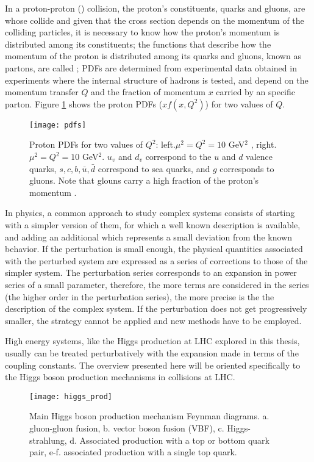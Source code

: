 In a proton-proton (\pp) collision, the proton's constituents, quarks and gluons, are whose collide and given that the \pp cross section depends on the momentum of the colliding particles, it is necessary to know how the proton's momentum is distributed among its constituents; the functions that describe how the momentum of the proton is distributed among its quarks and gluons, known as partons, are called ; PDFs are determined from experimental data obtained in experiments where the internal structure of hadrons is tested, and depend on the momentum transfer $Q$ and the fraction of momentum $x$ carried by an specific parton. Figure \ref{fig:pdfs} shows the proton PDFs ($xf(x,Q^2)$) for two values of $Q$.     

\begin{figure}[!h]
\centering
\texttt{[image: pdfs]}
\caption[Proton PDFs]{Proton PDFs for two values of $Q^2$: left.$\mu^2=Q^2=10$ GeV$^2$ , right. $\mu^2=Q^2=10$ GeV$^2$. $u_v$ and $d_v$ correspond to the $u$ and $d$ valence quarks, $s, c, b, \bar{u}, \bar{d}$ correspond to sea quarks, and $g$ corresponds to gluons. Note that glouns carry a high fraction of the proton's momentum \cite{pdg}.}
\label{fig:pdfs}
\end{figure}

In physics, a common approach to study complex systems consists of starting with a simpler version of them, for which a well known description is available, and adding an additional  which represents a small deviation from the known behavior. If the perturbation is small enough, the physical quantities associated with the perturbed system are expressed as a series of corrections to those of the simpler system. The perturbation series corresponds to an expansion in power series of a small parameter, therefore, the more terms are considered in the series (the higher order in the perturbation series), the more precise is the the description of the complex system. If the perturbation does not get progressively smaller, the strategy cannot be applied and new methods have to be employed. 

High energy systems, like the Higgs production at LHC explored in this thesis, usually can be treated perturbatively with the expansion made in terms of the coupling constants. The overview presented here will be oriented specifically to the Higgs boson production mechanisms in \pp collisions at LHC.

\begin{figure}[!h]
\centering
\texttt{[image: higgs\_prod]}
\caption[Higgs boson production mechanism Feynman diagrams]{Main Higgs boson production mechanism Feynman diagrams. a. gluon-gluon fusion, b. vector boson fusion (VBF), c. Higgs-strahlung, d. Associated production with a top or bottom quark pair, e-f. associated production with a single top quark.}
\label{higgs_prod}
\end{figure}

